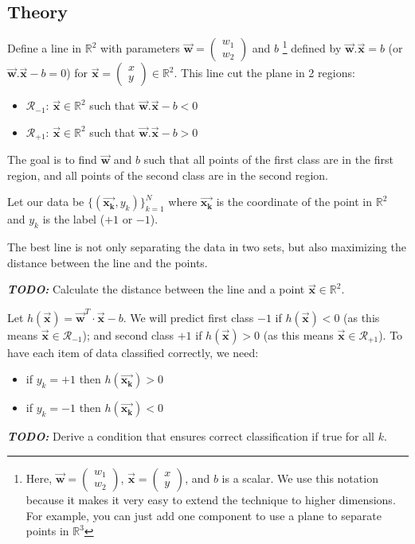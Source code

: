 \documentclass[]{article}
\newcommand{\R}{\mathbb{R}}
\newcommand{\vecx}{ \vec{\mathbf{x}} }
\newcommand{\vecxk}{ \vec{\mathbf{x_k}} }
\newcommand{\vecw}{ \vec{\mathbf{w}} }
\begin{document}
	\subsection{Theory}
	Define a line in $\R^2$ with parameters $\vecw = \begin{pmatrix} w_1 \\ w_2 \end{pmatrix}$ and $b$
	\footnote{
		Here, $\vecw = \begin{pmatrix} w_1 \\ w_2 \end{pmatrix}$, $\vecx = \begin{pmatrix} x \\ y \end{pmatrix}$, and $b$ is a scalar.
		We use this notation because it makes it very easy to extend the technique to higher dimensions.
		For example, you can just add one component to use a plane to separate points in $\mathbb{R}^3$
	}
	defined by $\vecw.\vecx = b$ (or $\vecw.\vecx - b = 0$) for $\vecx = \begin{pmatrix} x \\ y \end{pmatrix} \in \R^2$.
	This line cut the plane in 2 regions:
	\begin{itemize}
		\item $\mathcal{R}_{-1}$: $\vecx \in \R^2$ such that $\vecw.\vecx - b < 0$
		\item $\mathcal{R}_{+1}$: $\vecx \in \R^2$ such that $\vecw.\vecx - b > 0$
	\end{itemize}
	The goal is to find $\vecw$ and $b$ such that all points of the first class are in the first region, and all points of the second class are in the second region.
	
	Let our data be $\{ (\vecxk, y_k) \}_{k=1}^N$ where $\vecxk$ is the coordinate of the point in $\R^2$ and $y_k$ is the label ($+1$ or $-1$).
	
	The best line is not only separating the data in two sets, but also maximizing the distance between the line and the points.
	
	\noindent \textbf{\textit{TODO:}}
	Calculate the distance between the line and a point $\vecx \in \R^2$.
	
	\vspace{0.5cm}
	
	Let $h(\vecx) = \vecw^T \cdot \vecx - b$.
	We will predict first class $-1$ if $h(\vecx)<0$ (as this means $\vecx \in \mathcal{R}_{-1}$); and second class $+1$ if $h(\vecx)>0$ (as this means $\vecx \in \mathcal{R}_{+1}$).
	To have each item of data classified correctly, we need:
	\begin{itemize}
		\item if $y_k = +1$ then $h(\vecxk)>0$
		\item if $y_k = -1$ then $h(\vecxk)<0$
	\end{itemize}
	\noindent \textbf{\textit{TODO:}}
	Derive a condition that ensures correct classification if true for all $k$.
	
\end{document}

